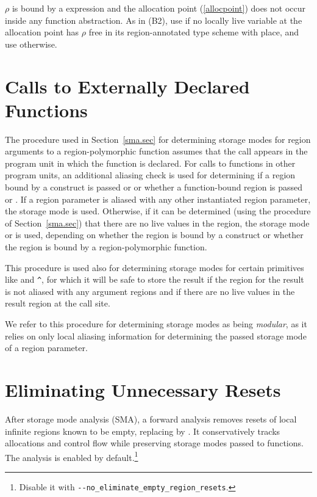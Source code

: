 \documentclass[12pt]{book}
\begin{document}
 $\rho$ is bound by a  expression and the
allocation point (\ref{allocpoint}) does not occur inside any function
abstraction.  As in (B2), use  if no locally live variable at the
allocation point has $\rho$ free in its region-annotated type scheme with place,
and use  otherwise.

\section{Calls to Externally Declared Functions}
\label{smaextern.sec}

The procedure used in Section~\ref{sma.sec} for determining storage modes for
region arguments to a region-polymorphic function assumes that the call appears
in the program unit in which the function is declared.  For calls to functions
in other program units, an additional aliasing check is used for determining if
a region bound by a  construct is passed  or 
or whether a function-bound region is passed  or . If a region
parameter is aliased with any other instantiated region parameter, the storage
mode  is used. Otherwise, if it can be determined (using the procedure
of Section~\ref{sma.sec}) that there are no live values in the region, the
storage mode  or  is used, depending on whether the region is
bound by a  construct or whether the region is bound by a
region-polymorphic function.

This procedure is used also for determining storage modes for certain primitives
like  and \lstinline{^}, for which it will be safe to store the
result  if the region for the result is not aliased with any argument
regions and if there are no live values in the result region at the call site.


We refer to this procedure for determining storage modes as being
%
%
\emph{modular}, as it relies on only local aliasing information for determining
the passed storage mode of a region parameter.

\section{Eliminating Unnecessary Resets}
\label{empty-region-resets.sec}
After storage mode analysis (SMA), a forward analysis removes resets of
local infinite regions known to be empty, replacing  by .
It conservatively tracks allocations and control flow while preserving
storage modes passed to functions. The analysis is enabled by default.\footnote{Disable
it with \lstinline{--no_eliminate_empty_region_resets}.}
\end{document}
